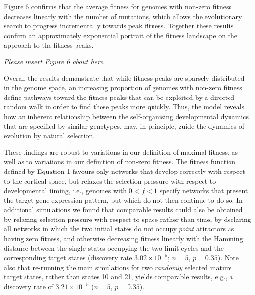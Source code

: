 \documentclass[10pt,letterpaper]{article}
\begin{document}

Figure 6 confirms that the average fitness for genomes with non-zero fitness decreases linearly with the number of mutations, which allows the evolutionary search to progress incrementally towards peak fitness. Together these results confirm an approximately exponential portrait of the fitness landscape on the approach to the fitness peaks.

\vspace{1em}\emph{\noindent Please insert Figure 6 about here.}\vspace{1em}

Overall the results demonstrate that while fitness peaks are sparsely distributed in the genome space, an increasing proportion of genomes with non-zero fitness define pathways toward the fitness peaks that can be exploited by a directed random walk in order to find those peaks more quickly. Thus, the model reveals how an inherent relationship between the self-organising developmental dynamics that are specified by similar genotypes, may, in principle, guide the dynamics of evolution by natural selection.

These findings are robust to variations in our definition of maximal fitness, as well as to variations in our definition of non-zero fitness. The fitness function defined by Equation 1 favours only networks that develop correctly with respect to the cortical space, but relaxes the selection pressure with respect to developmental timing, i.e., genomes with $0<f<1$ specify networks that present the target gene-expression pattern, but which do not then continue to do so. In additional simulations we found that comparable results could also be obtained by relaxing selection pressure with respect to space rather than time, by declaring all networks in which the two initial states do not occupy \emph{point} attractors as having zero fitness, and otherwise decreasing fitness linearly with the Hamming distance between the single states occupying the two limit cycles and the corresponding target states (discovery rate $3.02\times 10^{-5}$; $n=5$, $p=0.35$). Note also that re-running the main simulations for two \emph{randomly} selected mature target states, rather than states 10 and 21, yields comparable results, e.g., a discovery rate of $3.21\times 10^{-5}$ ($n=5$, $p=0.35$).%
\end{document}
